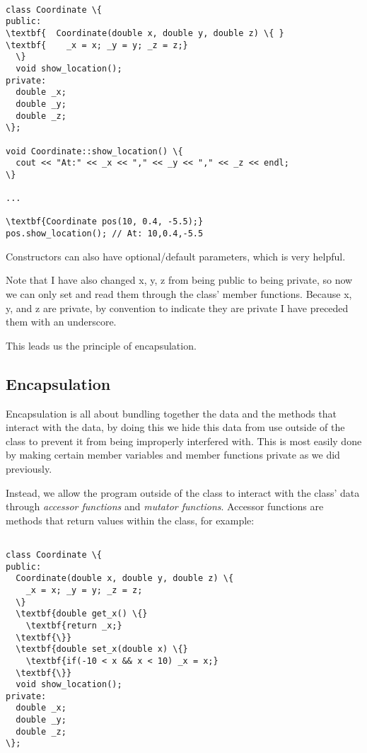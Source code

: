 \documentclass{IEEEtran}
\begin{document}
\begin{Verbatim}[fontsize=\scriptsize, xleftmargin=.3in, commandchars=\\\{\}]

class Coordinate \{
public:
\textbf{  Coordinate(double x, double y, double z) \{ }
\textbf{    _x = x; _y = y; _z = z;}
  \}
  void show_location();
private:
  double _x;
  double _y;
  double _z;
\};

void Coordinate::show_location() \{
  cout << "At:" << _x << "," << _y << "," << _z << endl;
\}

...

\textbf{Coordinate pos(10, 0.4, -5.5);}
pos.show_location(); // At: 10,0.4,-5.5

\end{Verbatim}

Constructors can also have optional/default parameters, which is very helpful.

Note that I have also changed x, y, z from being public to being private, so now we can only set and read them through the class' member functions. Because x, y, and z are private, by convention to indicate they are private I have preceded them with an underscore.

This leads us the principle of encapsulation.

\subsection{Encapsulation}

Encapsulation is all about bundling together the data and the methods that interact with the data, by doing this we hide this data from use outside of the class to prevent it from being improperly interfered with. This is most easily done by making certain member variables and member functions private as we did previously.

Instead, we allow the program outside of the class to interact with the class' data through \textit{accessor functions} and \textit{mutator functions}. Accessor functions are methods that return values within the class, for example:

\begin{Verbatim}[fontsize=\scriptsize, xleftmargin=.3in, commandchars=\\\{\}]

class Coordinate \{
public:
  Coordinate(double x, double y, double z) \{ 
    _x = x; _y = y; _z = z;
  \}
  \textbf{double get_x() \{}
    \textbf{return _x;}
  \textbf{\}}
  \textbf{double set_x(double x) \{}
    \textbf{if(-10 < x && x < 10) _x = x;}    
  \textbf{\}}
  void show_location();
private:
  double _x;
  double _y;
  double _z;
\};

\end{Verbatim}
\end{document}
